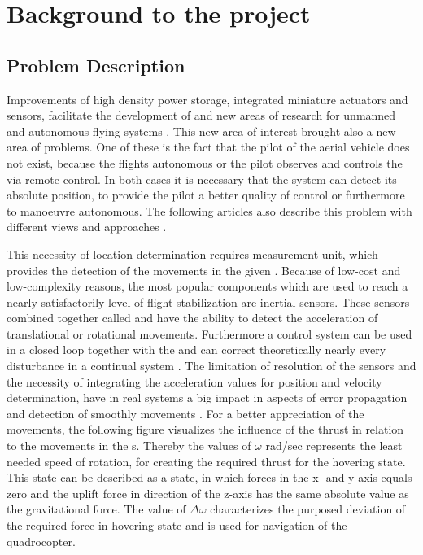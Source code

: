 \chapter{Background to the project}

\section{Problem Description}

Improvements of high density power storage, integrated miniature actuators and
sensors, facilitate the development of \MAV and new areas of research for
unmanned and autonomous flying systems .
 This new area of interest brought also a new area of problems.
 One of these is the fact that the pilot of the aerial vehicle does not exist,
 because the \UAV flights autonomous or the pilot observes and controls the \UAV via
 remote control. In both cases it is necessary that the \UAV system can detect
 its absolute position, to provide the pilot a better quality of control or
 furthermore to manoeuvre autonomous. The following articles also describe this
 problem with different views and approaches 
.


This necessity of location determination requires measurement unit, which
provides the detection of the movements in the given \DOF. Because of low-cost
and low-complexity reasons, the most popular components which are used to reach
a nearly satisfactorily level of flight stabilization are inertial sensors.
These sensors combined together called \IMU and have the ability to detect the
acceleration of translational or rotational movements.
\newpage Furthermore a control
system can be used in a closed loop together with the \IMU and can correct
theoretically nearly every disturbance in a continual system 
.
The limitation of resolution of the sensors and the necessity of integrating the
acceleration values for position and velocity determination, have in real systems
a big impact in aspects of error propagation and detection of smoothly movements
 .
For a better appreciation of the movements, the following figure visualizes the
influence of the thrust in relation to the movements in the \DOF s. Thereby the
 values of  \ensuremath{\omega} \lbrack rad/sec \rbrack represents the least
needed speed of rotation, for creating the required thrust for the hovering
state. This state can be described as a state, in which forces in the x- and
y-axis equals zero and the uplift force in direction of the z-axis has the
same absolute value as the gravitational force. The value of 
\ensuremath{\Delta}\ensuremath{\omega} characterizes the purposed deviation of the required force
in hovering state and is used for navigation of the quadrocopter.



